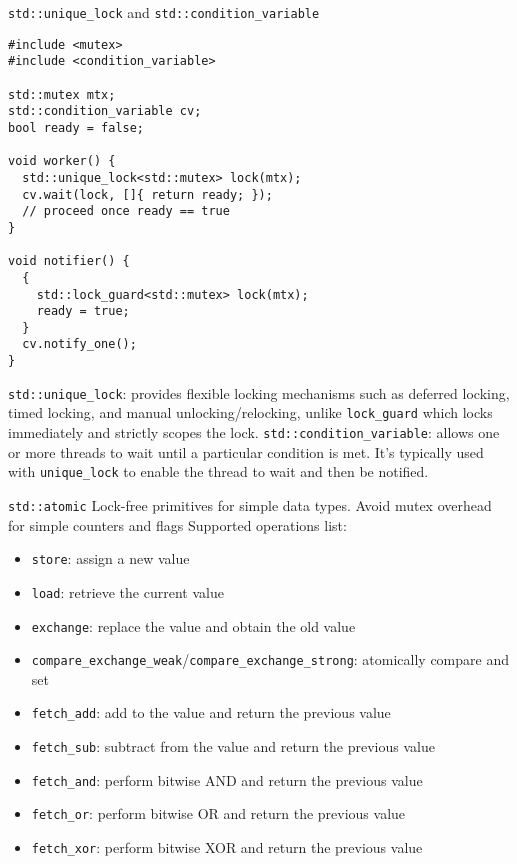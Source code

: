 \documentclass{beamer}
\begin{document}
\begin{frame}[fragile]{\texttt{std::unique\_lock} and \texttt{std::condition\_variable}}
  \lstset{style=CStyle}
  \begin{lstlisting}
#include <mutex>
#include <condition_variable>

std::mutex mtx;
std::condition_variable cv;
bool ready = false;

void worker() {
  std::unique_lock<std::mutex> lock(mtx);
  cv.wait(lock, []{ return ready; });
  // proceed once ready == true
}

void notifier() {
  {
    std::lock_guard<std::mutex> lock(mtx);
    ready = true;
  }
  cv.notify_one();
}
  \end{lstlisting}
  \texttt{std::unique\_lock}: provides flexible locking mechanisms such as deferred locking, timed locking, and manual unlocking/relocking, unlike \texttt{lock\_guard} which locks immediately and strictly scopes the lock.
  \texttt{std::condition\_variable}: allows one or more threads to wait until a particular condition is met. It’s typically used with \texttt{unique\_lock} to enable the thread to wait and then be notified.
\end{frame}

\begin{frame}{\texttt{std::atomic}}
  Lock-free primitives for simple data types. Avoid mutex overhead for simple counters and flags
  Supported operations list:
  \begin{itemize}
    \item \texttt{store}: assign a new value
    \item \texttt{load}: retrieve the current value
    \item \texttt{exchange}: replace the value and obtain the old value
    \item \texttt{compare\_exchange\_weak}/\texttt{compare\_exchange\_strong}: atomically compare and set
    \item \texttt{fetch\_add}: add to the value and return the previous value
    \item \texttt{fetch\_sub}: subtract from the value and return the previous value
    \item \texttt{fetch\_and}: perform bitwise AND and return the previous value
    \item \texttt{fetch\_or}: perform bitwise OR and return the previous value
    \item \texttt{fetch\_xor}: perform bitwise XOR and return the previous value
  \end{itemize}
\end{frame}
\end{document}
